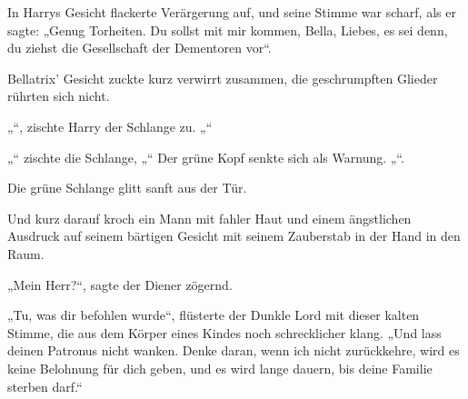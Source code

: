 In Harrys Gesicht flackerte Verärgerung auf, und seine Stimme war scharf, als er sagte: „Genug Torheiten. Du sollst mit mir kommen, Bella, Liebes, es sei denn, du ziehst die Gesellschaft der Dementoren vor“.

Bellatrix' Gesicht zuckte kurz verwirrt zusammen, die geschrumpften Glieder rührten sich nicht.

„“, zischte Harry der Schlange zu. „“

„“ zischte die Schlange, „“ Der grüne Kopf senkte sich als Warnung. „“.

Die grüne Schlange glitt sanft aus der Tür.

Und kurz darauf kroch ein Mann mit fahler Haut und einem ängstlichen Ausdruck auf seinem bärtigen Gesicht mit seinem Zauberstab in der Hand in den Raum.

„Mein Herr?“, sagte der Diener zögernd.

„Tu, was dir befohlen wurde“, flüsterte der Dunkle Lord mit dieser kalten Stimme, die aus dem Körper eines Kindes noch schrecklicher klang. „Und lass deinen Patronus nicht wanken. Denke daran, wenn ich nicht zurückkehre, wird es keine Belohnung für dich geben, und es wird lange dauern, bis deine Familie sterben darf.“

